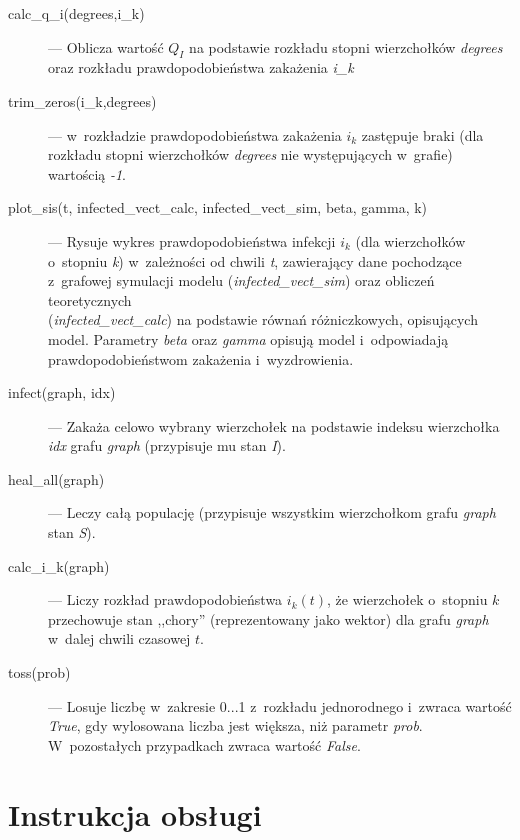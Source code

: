 \begin{enumerate}
\begin{description}
\item[calc\_q\_i(degrees,i\_k)] --- Oblicza wartość $Q_I$ na podstawie rozkładu stopni wierzchołków \emph{degrees} oraz rozkładu prawdopodobieństwa zakażenia \emph{i\_k}
\item[trim\_zeros(i\_k,degrees)] --- w~rozkładzie prawdopodobieństwa zakażenia $i_k$ zastępuje braki (dla rozkładu stopni wierzchołków \emph{degrees} nie występujących w~grafie) wartością \emph{-1}.
\item[plot\_sis(t, infected\_vect\_calc, infected\_vect\_sim, beta, gamma, k)] --- Rysuje wykres prawdopodobieństwa infekcji $i_k$ (dla wierzchołków o~stopniu \emph{k}) w~zależności od chwili \emph{t}, zawierający dane pochodzące z~grafowej symulacji modelu (\emph{infected\_vect\_sim}) oraz obliczeń teoretycznych \\ (\emph{infected\_vect\_calc}) na podstawie równań różniczkowych, opisujących model. Parametry \emph{beta} oraz \emph{gamma} opisują model i~odpowiadają prawdopodobieństwom zakażenia i~wyzdrowienia. 
\item[infect(graph, idx)] --- Zakaża celowo wybrany wierzchołek na podstawie indeksu wierzchołka \emph{idx} grafu \emph{graph} (przypisuje mu stan \emph{I}).
\item[heal\_all(graph)] --- Leczy całą populację (przypisuje wszystkim wierzchołkom grafu \emph{graph} stan \emph{S}).
\item[calc\_i\_k(graph)] --- Liczy rozkład prawdopodobieństwa $\displaystyle i_k(t)$, że wierzchołek o~stopniu $k$ przechowuje stan ,,chory'' (reprezentowany jako wektor) dla grafu \emph{graph} w~dalej chwili czasowej $t$.
\item[toss(prob)] --- Losuje liczbę w~zakresie 0...1 z~rozkładu jednorodnego i~zwraca wartość \emph{True}, gdy wylosowana liczba jest większa, niż parametr \emph{prob}. W~pozostałych przypadkach zwraca wartość \emph{False}.
\end{description}

\section{Instrukcja obsługi}
\label{sec:instrukcja_obslugi}


\end{enumerate}
